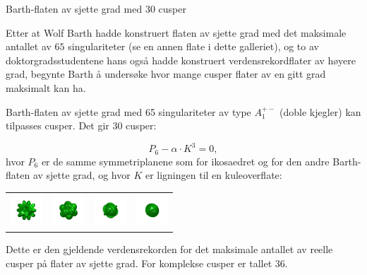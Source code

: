 \documentclass[no]{./../../common/SurferDesc}%
\begin{document}
\footnotesize



\begin{surferPage}
  \begin{surferTitle}Barth-flaten av sjette grad med 30 cusper\end{surferTitle}  

Etter at Wolf Barth hadde konstruert flaten av sjette grad med det maksimale antallet av $65$ singulariteter (se en annen flate i dette galleriet), og to av doktorgradsstudentene hans også hadde konstruert verdensrekordflater av høyere grad, begynte Barth å undersøke hvor mange cusper flater av en gitt grad maksimalt kan ha.  

   Barth-flaten av sjette grad med 65 singulariteter av type $A_1^{+-}$ (doble kjegler) kan tilpasses cusper. Det gir 30 cusper: 
   
    \[P_6 - \alpha \cdot K^3=0,\]
  hvor $P_6$ er de samme symmetriplanene som for ikosaedret og for den andre Barth-flaten av sjette grad, og hvor $K$ er ligningen til en kuleoverflate:
    \vspace*{-0.4em}
    \begin{center}
      \begin{tabular}{c@{\ }c@{\ }c@{\ }c}
        \includegraphics[height=1.2cm]{./../../common/images/barthsextic_30A2}
        &
        \includegraphics[height=1.2cm]{./../../common/images/barthsextic_30A2_3}
        &
        \includegraphics[height=1.2cm]{./../../common/images/barthsextic_30A2_5}
        &
        \includegraphics[height=1.2cm]{./../../common/images/barthsextic_30A2_6}
      \end{tabular}
    \end{center}    
    \vspace*{-0.3em}
   Dette er den gjeldende verdensrekorden for det maksimale antallet av reelle cusper på flater av sjette grad. For komplekse cusper er tallet $36$.


  \begin{surferText}
     \end{surferText}
\end{surferPage}
\end{document}
